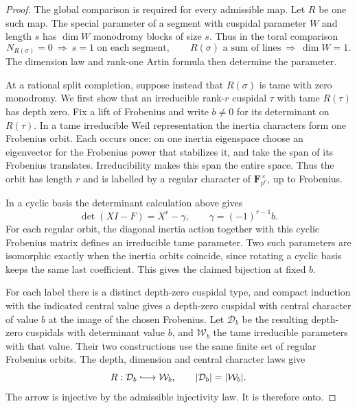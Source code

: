 \begin{proof}

The global comparison is required for every admissible map.
Let \(R\) be one such map. The special parameter of a segment with cuspidal
parameter \(W\) and length \(s\) has \(\dim W\) monodromy
blocks of size \(s\). Thus in the toral comparison
\[
 N_{R(\sigma)}=0\ \Longrightarrow\ s=1\text{ on each segment},
 \qquad R(\sigma)\text{ a sum of lines}\ \Longrightarrow\ \dim W=1.
\]
The dimension law and rank-one Artin formula then determine the parameter.


At a rational split completion, suppose instead that
\(R(\sigma)\) is tame with zero monodromy. We first show
that an irreducible rank-\(r\) cuspidal \(\tau\) with tame
\(R(\tau)\) has depth zero. Fix a lift of Frobenius and
write \(b\ne0\) for its determinant on \(R(\tau)\).
In a tame irreducible Weil representation the inertia
characters form one Frobenius orbit. Each occurs once:
on one inertia eigenspace choose an eigenvector for the
Frobenius power that stabilizes it, and take the span of its
Frobenius translates. Irreducibility makes this span the
entire space. Thus the orbit has length \(r\) and is
labelled by a regular character of
\(\mathbf F_{p^r}^{\times}\), up to Frobenius.

In a cyclic basis the determinant calculation above gives
\[
      \det(XI-F)=X^r-\gamma,\qquad \gamma=(-1)^{r-1}b .
\] For each regular orbit, the
diagonal inertia action together with this cyclic Frobenius
matrix defines an irreducible tame parameter. Two such
parameters are isomorphic exactly when the inertia orbits
coincide, since rotating a cyclic basis keeps the same last
coefficient. This gives the claimed bijection at fixed \(b\).


For each label there is a distinct depth-zero cuspidal
type, and compact induction with the indicated central
value gives a depth-zero cuspidal with central character
of value \(b\) at the image of the chosen Frobenius.
Let \(\mathcal D_b\) be the resulting depth-zero cuspidals
with determinant value \(b\), and \(\mathcal W_b\) the tame
irreducible parameters with that value. Their two constructions
use the same finite set of regular Frobenius orbits. The depth,
dimension and central character laws give
\[
          R:\mathcal D_b\lhook\joinrel\longrightarrow\mathcal W_b,
          \qquad |\mathcal D_b|=|\mathcal W_b|.
\]
The arrow is injective by the admissible injectivity law.
It is therefore onto.


\end{proof}
